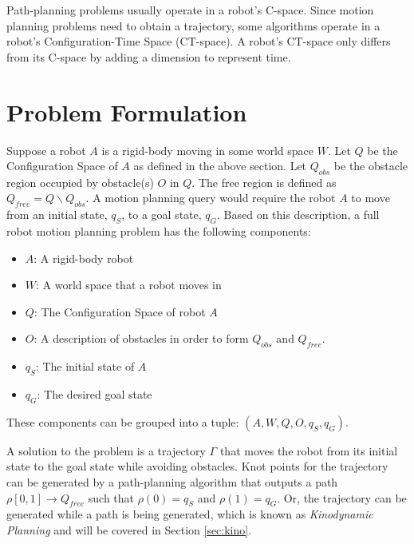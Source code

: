 \documentclass[10pt,conference]{ieeeconf}
\begin{document}
Path-planning problems usually operate in a robot's C-space. Since motion planning problems need to obtain a trajectory, some algorithms operate in a robot's Configuration-Time Space (CT-space). A robot's CT-space only differs from its C-space by adding a dimension to represent time.


\section{Problem Formulation} \label{sec:probform}


Suppose a robot $A$ is a rigid-body moving in some world space $W$. Let $Q$ be the Configuration Space of $A$ as defined in the above section. Let $Q_{obs}$ be the obstacle region occupied by obstacle(s) $O$ in $Q$. The free region is defined as $Q_{free} = Q \backslash Q_{obs}$. A motion planning query would require the robot $A$ to move from an initial state, $q_S$, to a goal state, $q_G$. Based on this description, a full robot motion planning problem has the following components:

\begin{itemize}
\item $A$: A rigid-body robot
\item $W$: A world space that a robot moves in
\item $Q$: The Configuration Space of robot $A$
\item $O$: A description of obstacles in order to form $Q_{obs}$ and $Q_{free}$.
\item $q_S$: The initial state of $A$
\item $q_G$: The desired goal state
\end{itemize}
 
These components can be grouped into a tuple: $(A, W, Q, O, q_S, q_G)$. 



A solution to the problem is a trajectory $\Gamma$ that moves the robot from its initial state to the goal state while avoiding obstacles. Knot points for the trajectory can be generated by a path-planning algorithm that outputs a path $\rho[0,1] \rightarrow Q_{free}$ such that $\rho(0) = q_S$ and $\rho(1) = q_G$. Or, the trajectory can be generated while a path is being generated, which is known as \emph{Kinodynamic Planning} and will be covered in Section \ref{sec:kino}.
\end{document}
